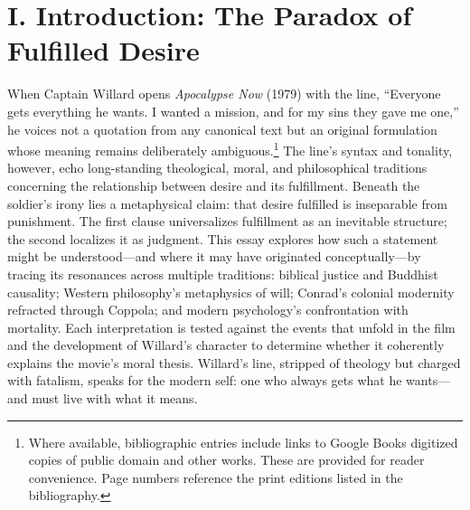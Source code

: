 \section*{I. Introduction: The Paradox of Fulfilled Desire}
\label{sec:i-introduction-the-paradox-of-fulfilled-desire}
When Captain Willard opens \textit{Apocalypse Now} (1979) with the line, ``Everyone gets
everything he wants. I wanted a mission, and for my sins they gave me one,'' he voices not a
quotation from any canonical text but an original formulation whose meaning remains deliberately
ambiguous.\footnote{Where available, bibliographic entries include links to Google Books
	digitized copies of public domain and other works. These are provided for reader convenience.
	Page numbers reference the print editions listed in the bibliography.} The line's syntax and
tonality, however, echo long-standing theological, moral, and philosophical traditions
concerning the relationship between desire and its fulfillment. Beneath the soldier's irony
lies a metaphysical claim: that desire fulfilled is inseparable from punishment. The first
clause universalizes fulfillment as an inevitable structure; the second localizes it as
judgment. This essay explores how such a statement might be understood—and where it may have
originated conceptually—by tracing its resonances across multiple traditions: biblical justice
and Buddhist causality; Western philosophy's metaphysics of will; Conrad's colonial modernity
refracted through Coppola; and modern psychology's confrontation with mortality. Each
interpretation is tested against the events that unfold in the film and the development of
Willard's character to determine whether it coherently explains the movie's moral thesis.
Willard's line, stripped of theology but charged with fatalism, speaks for the modern self:
one who always gets what he wants—and must live with what it means.
